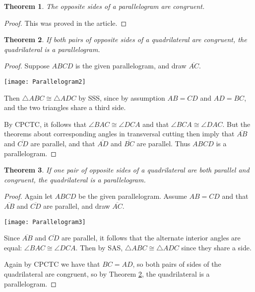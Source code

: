 \documentclass[12pt]{article}
\newcommand{\ol}{\overline}
\newtheorem{thm}{Theorem}
\begin{document}
\begin{thm} \label{thm:one}The opposite sides of a parallelogram are congruent.
\end{thm}
\begin{proof} This was proved in the  article.
\end{proof}

\begin{thm} \label{thm:two}If both pairs of opposite sides of a quadrilateral are congruent, the quadrilateral is a parallelogram.
\end{thm}
\begin{proof}
Suppose $ABCD$ is the given parallelogram, and draw $\ol{AC}$. 
\begin{center}\texttt{[image: Parallelogram2]}\end{center}
Then $\triangle ABC\cong\triangle ADC$ by SSS, since by assumption $AB=CD$ and $AD=BC$, and the two triangles share a third side.

By CPCTC, it follows that $\angle BAC\cong\angle DCA$ and that $\angle BCA\cong \angle DAC$. But the theorems about corresponding angles in transversal cutting then imply that $\ol{AB}$ and $\ol{CD}$ are parallel, and that $\ol{AD}$ and $\ol{BC}$ are parallel. Thus $ABCD$ is a parallelogram.
\end{proof}

\begin{thm} \label{thm:three}If one pair of opposite sides of a quadrilateral are both parallel and congruent, the quadrilateral is a parallelogram.
\end{thm}
\begin{proof}
Again let $ABCD$ be the given parallelogram. Assume $AB=CD$ and that $\ol{AB}$ and $\ol{CD}$ are parallel, and draw $\ol{AC}$. 
\begin{center}\texttt{[image: Parallelogram3]}\end{center}
Since $\ol{AB}$ and $\ol{CD}$ are parallel, it follows that the alternate interior angles are equal: $\angle BAC\cong \angle DCA$. Then by SAS, $\triangle ABC\cong \triangle ADC$ since they share a side.

Again by CPCTC we have that $BC=AD$, so both pairs of sides of the quadrilateral are congruent, so by Theorem \ref{thm:two}, the quadrilateral is a parallelogram.
\end{proof}
\end{document}
